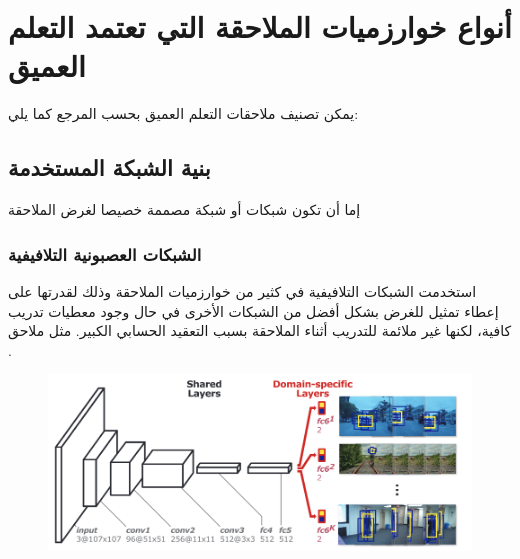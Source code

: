 \section{أنواع خوارزميات الملاحقة التي تعتمد  التعلم العميق}
يمكن تصنيف ملاحقات التعلم العميق بحسب المرجع
 كما يلي:
 \subsection{بنية الشبكة المستخدمة}
 إما أن تكون شبكات
 أو شبكة مصممة خصيصا لغرض الملاحقة
 \subsubsection{
 	الشبكات العصبونية التلافيفية
 }
استخدمت الشبكات التلافيفية في كثير من خوارزميات الملاحقة وذلك لقدرتها على إعطاء تمثيل للغرض بشكل أفضل من الشبكات الأخرى في حال وجود معطيات تدريب كافية،
لكنها غير ملائمة للتدريب أثناء الملاحقة
بسبب التعقيد الحسابي الكبير.
مثل ملاحق 
 .
 \begin{figure}[h!]
 	\centerline{\includegraphics[width=\textwidth]{images/MDNet}}
 	\caption{
 		}	
 \end{figure}
